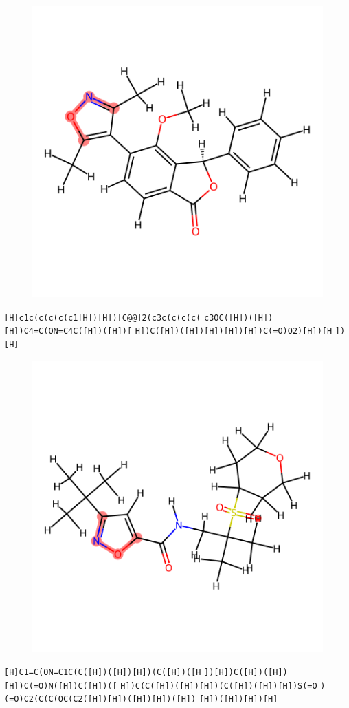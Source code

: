 \documentclass{article}
\begin{document}
\begin{figure}[ht]
\centering
    \includegraphics{mol264.png}
\end{figure}
\verb|[H]c1c(c(c(c(c1[H])[H])[C@@]2(c3c(c(c(c(| \verb|c3OC([H])([H])[H])C4=C(ON=C4C([H])([H])[| \verb|H])C([H])([H])[H])[H])[H])C(=O)O2)[H])[H| \verb|])[H]|

\begin{figure}[ht]
\centering
    \includegraphics{mol265.png}
\end{figure}
\verb|[H]C1=C(ON=C1C(C([H])([H])[H])(C([H])([H| \verb|])[H])C([H])([H])[H])C(=O)N([H])C([H])([| \verb|H])C(C([H])([H])[H])(C([H])([H])[H])S(=O| \verb|)(=O)C2(C(C(OC(C2([H])[H])([H])[H])([H])| \verb|[H])([H])[H])[H]|
\end{document}
